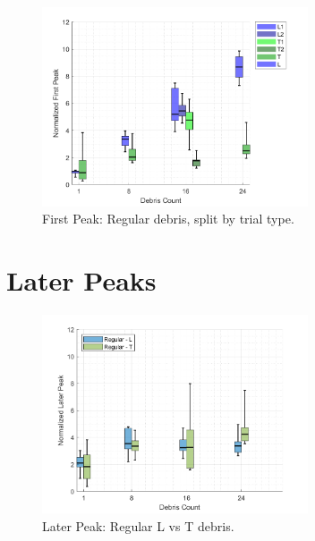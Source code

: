 \documentclass[12pt,a4paper]{article}
\begin{document}
\begin{figure}[h!]
    \centering
    \includegraphics[width=0.7\textwidth]{figures/FirstPeak_Regular_SplitByTrial.png}
    \caption{First Peak: Regular debris, split by trial type.}
    \label{fig:FirstPeak_Regular_SplitByTrial}
\end{figure}

\section{Later Peaks}

\begin{figure}[h!]
    \centering
    \includegraphics[width=0.7\textwidth]{figures/LaterPeak_Regular_L_vs_T.png}
    \caption{Later Peak: Regular L vs T debris.}
    \label{fig:LaterPeak_Regular_L_vs_T}
\end{figure}

\end{document}
